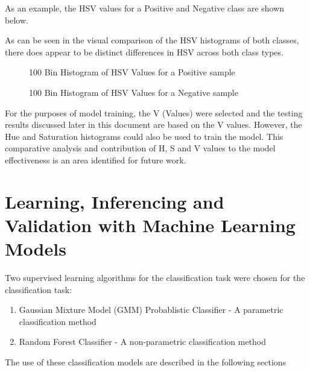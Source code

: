 \documentclass[a4paper,twoside,12pt]{report}
\begin{document}
As an example, the HSV values for a Positive and Negative class are shown below. 

As can be seen in the visual comparison of the HSV histograms of both classes, there does appear to be distinct differences in HSV across both class types. 

\begin{figure}[!htbp]
\centering
{} %
{}
\caption{100 Bin Histogram of HSV Values for a Positive sample}
\label{fig:subfigures}
\end{figure}

\begin{figure}[!htbp]
\centering
\subfloat[[Histogram of Hues]{\label{fig:mdright}{\texttt{[image: images/negative\_hue]}}} %
{}
\caption{100 Bin Histogram of HSV Values for a Negative sample}
\label{fig:subfigures}
\end{figure}

For the purposes of model training, the V (Values) were selected and the testing results discussed later in this document are based on the V values.   However, the Hue and Saturation histograms could also be used to train the model.  This comparative analysis and contribution of H, S and V values to the model effectiveness is an area identified for future work.   


\chapter{Learning, Inferencing and Validation with Machine Learning Models}

Two supervised learning algorithms for the classification task were chosen for the classification task:
\begin{enumerate}
\item Gaussian Mixture Model (GMM) Probablistic Classifier - A parametric classification method
\item Random Forest Classifier -  A non-parametric classification method
\end{enumerate}
The use of these classification models are described in the following sections
\end{document}
